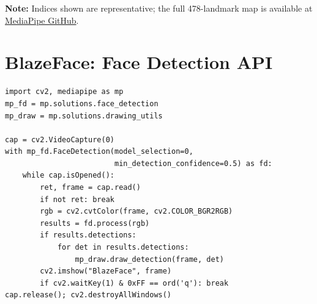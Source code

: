\documentclass[12pt,a4paper]{article}
\begin{document}
\begin{center}
\end{center}

\bigskip

\textbf{Note:} Indices shown are representative; the full 478-landmark map is available
at \href{https://github.com/google/mediapipe/blob/master/mediapipe/modules/face_geometry/data/canonical_face_model_uv_visualization.png}{MediaPipe GitHub}.

\section{BlazeFace: Face Detection API}

\begin{lstlisting}[caption={Minimal face detection}]
import cv2, mediapipe as mp
mp_fd = mp.solutions.face_detection
mp_draw = mp.solutions.drawing_utils

cap = cv2.VideoCapture(0)
with mp_fd.FaceDetection(model_selection=0,
                         min_detection_confidence=0.5) as fd:
    while cap.isOpened():
        ret, frame = cap.read()
        if not ret: break
        rgb = cv2.cvtColor(frame, cv2.COLOR_BGR2RGB)
        results = fd.process(rgb)
        if results.detections:
            for det in results.detections:
                mp_draw.draw_detection(frame, det)
        cv2.imshow("BlazeFace", frame)
        if cv2.waitKey(1) & 0xFF == ord('q'): break
cap.release(); cv2.destroyAllWindows()
\end{lstlisting}
\end{document}
